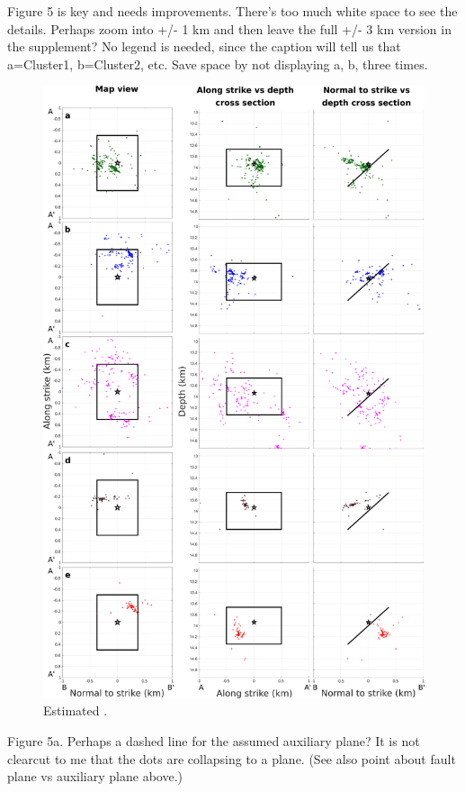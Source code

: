 \documentclass[10pt]{extarticle}
\begin{document}
\begin{ReviewerComment}{1}
\noindent 
Figure 5 is key and needs improvements. There's too much white space to see the details.  Perhaps zoom into +/- 1 km and then leave the full +/- 3 km version in the supplement? No legend is needed, since the caption will tell us that a=Cluster1, b=Cluster2, etc. Save space by not displaying a, b, three times.
\end{ReviewerComment}


\begin{Answer}
\begin{figure}[!h]
\includegraphics[width=0.8\linewidth]{maps_clusters}
\caption{Estimated .}
\label{fig:map_improved}
\end{figure}
 \WorkInProgressRevTask
\end{Answer}
%
%


\begin{ReviewerComment}{1}
\noindent 
Figure 5a. Perhaps a dashed line for the assumed auxiliary plane? It is not clearcut to me that the dots are collapsing to a plane. (See also point about fault plane vs auxiliary plane above.)
\end{ReviewerComment}
\end{document}
